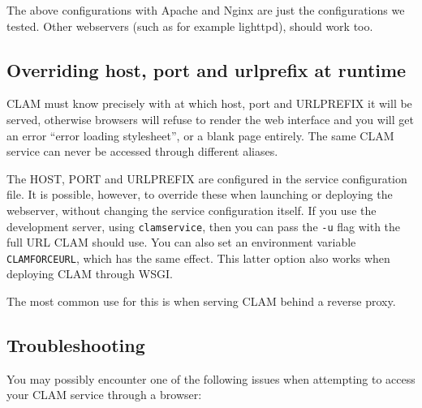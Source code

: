 \documentclass[a4paper,12pt,twoside,openright]{report}
\begin{document}
The above configurations with Apache and Nginx are just the configurations we
tested. Other webservers (such as for example lighttpd), should work too. 

\subsection{Overriding host, port and urlprefix at runtime}

CLAM must know precisely with at which host, port and URLPREFIX it will be
served, otherwise browsers will refuse to render the web interface and you will
get an error ``error loading stylesheet'', or a blank page entirely.  The same
CLAM service can never be accessed through different aliases.

The HOST, PORT and URLPREFIX are configured in the service configuration file.
It is possible, however, to override these when launching or deploying the
webserver, without changing the service configuration itself. If you use the
development server, using \texttt{clamservice}, then you can pass the
\texttt{-u} flag with the full URL CLAM should use. You can also set an
environment variable \texttt{CLAMFORCEURL}, which has the same effect. This
latter option also works when deploying CLAM through WSGI.

The most common use for this is when serving CLAM behind a reverse proxy.

\subsection{Troubleshooting}

You may possibly encounter one of the following issues when attempting to access your CLAM service through a browser:
\end{document}
